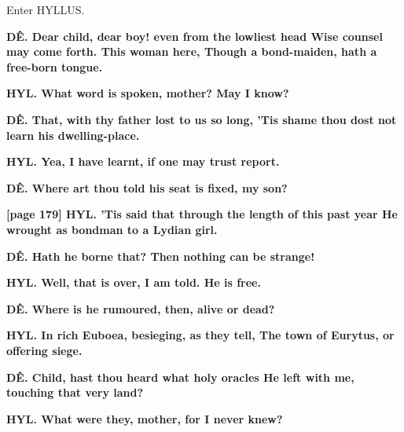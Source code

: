 \documentclass[11pt,letter]{book}
\begin{document}
\par  Enter HYLLUS.

\par \textbf{DÊ. Dear child, dear boy! even from the lowliest head Wise counsel may come forth. This woman here, Though a bond-maiden, hath a free-born tongue.}
\par 

\par \textbf{HYL. What word is spoken, mother? May I know?}
\par 

\par \textbf{DÊ. That, with thy father lost to us so long, ’Tis shame thou dost not learn his dwelling-place.}
\par 

\par \textbf{HYL. Yea, I have learnt, if one may trust report.}
\par 

\par \textbf{DÊ. Where art thou told his seat is fixed, my son?}
\par 

\par \textbf{[page 179] HYL. ’Tis said that through the length of this past year He wrought as bondman to a Lydian girl.}
\par 

\par \textbf{DÊ. Hath he borne that? Then nothing can be strange!}
\par 

\par \textbf{HYL. Well, that is over, I am told. He is free.}
\par 

\par \textbf{DÊ. Where is he rumoured, then, alive or dead?}
\par 

\par \textbf{HYL. In rich Euboea, besieging, as they tell, The town of Eurytus, or offering siege.}
\par 

\par \textbf{DÊ. Child, hast thou heard what holy oracles He left with me, touching that very land?}
\par 

\par \textbf{HYL. What were they, mother, for I never knew?}
\par 
\end{document}
